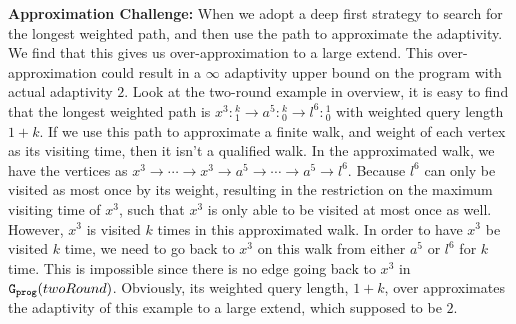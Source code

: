 \textbf{Approximation Challenge:}
When we adopt a deep first strategy to search for the longest weighted path, and then use the path to approximate the adaptivity. We find that this gives us over-approximation to a large extend.
This over-approximation could result in a $\infty$ adaptivity upper bound on the program with actual adaptivity $2$.
Look at the two-round example in overview, 
it is easy to find that the longest weighted path is  $x^3 : {}^{k}_{1} \to a^5 : {}^{k}_{0} \to l^6 : {}^{1}_{0}$ with weighted query length $1 + k$.
If we use this path to approximate a finite walk, and weight of each vertex as
its visiting time,
then it isn't a qualified walk. 
In the approximated walk, we have the vertices as $x^3 \to \cdots \to x^3 \to a^5 \to \cdots \to a^5 \to l^6$.
Because $l^6$ can only be visited as most once by its weight,
resulting in the restriction on the maximum visiting time of $x^3$,
such that $x^3$ is only able to be visited at most once as well.
%
However, $x^3$ is visited $k$ times in this approximated walk.
In order to have $x^3$ be visited $k$ time, we need to go back to 
$x^3$ on this walk from either $a^5$ or $l^6$ for $k$ time.
This is impossible since there is no edge going back to $x^3$ in $\mathtt{{G_{prog}}}(twoRound)$.
Obviously,
its weighted query length, $1 + k$, 
over approximates 
the adaptivity of this example to a large extend, which supposed to be $2$. 


